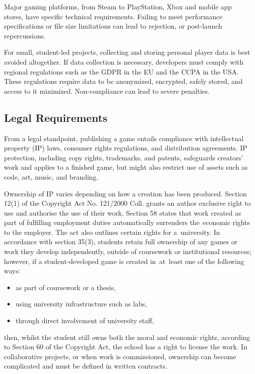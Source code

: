 Major gaming platforms, from Steam to PlayStation, Xbox and mobile app stores, have specific technical requirements. Failing to meet performance specifications or file size limitations can lead to rejection, or post-launch repercussions.
\cite{apple-ios-apps}

For small, student-led projects, collecting and storing personal player data is best avoided altogether. If data collection is necessary, developers must comply with regional regulations such as the GDPR in the EU and the CCPA in the USA\cite{eu_gdpr, doj_ccpa}. These regulations require data to be anonymized, encrypted, safely stored, and access to it minimized. Non-compliance can lead to severe penalties.
\cite{silva_guide-to-release}

\subsection{Legal Requirements}\label{subsec:legal-requirements}
From a legal standpoint, publishing a game entails compliance with intellectual property (IP) laws, consumer rights regulations, and distribution agreements. IP protection, including copy rights, trademarks, and patents, safeguards creators’ work and applies to a finished game, but might also restrict use of assets such as code, art, music, and branding.
\cite{jd-supra_ip}

Ownership of IP varies depending on how a creation has been produced. Section 12(1) of the Copyright Act No. 121/2000 Coll. grants an author exclusive right to use and authorise the use of their work. Section 58 states that work created as part of fulfilling employment duties automatically surrenders the~economic rights to the employer. The act also outlines certain rights for a~university. In accordance with section 35(3), students retain full ownership of any games or work they develop independently, outside of coursework or institutional resources; however, if a student-developed game is created in~at~least one of the following ways:
\begin{itemize}
	\item as part of coursework or a thesis,
	\item using university infrastructure such as labs,
	\item through direct involvement of university staff,
\end{itemize}
then, whilst the student still owns both the moral and economic rights, according to Section 60 of the Copyright Act, the school has a right to license the work. In collaborative projects, or when work is commissioned, ownership can become complicated and must be defined in written contracts.
\cite{Kurzy_autorsky-zakon, silva_guide-to-release, jd-supra_ip}

